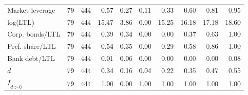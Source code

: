 \begin{threeparttable}
\begin{tabular}{lrrrrrrrrr}
Market leverage & 79 & 444 & 0.57 & 0.27 & 0.11 & 0.33 & 0.60 & 0.81 & 0.95 \\
log(LTL) & 79 & 444 & 15.47 & 3.86 & 0.00 & 15.25 & 16.18 & 17.18 & 18.60 \\
Corp. bonds/LTL & 79 & 444 & 0.39 & 0.34 & 0.00 & 0.00 & 0.37 & 0.63 & 1.00 \\
Pref. share/LTL & 79 & 444 & 0.54 & 0.35 & 0.00 & 0.29 & 0.58 & 0.86 & 1.00 \\
Bank debt/LTL & 79 & 444 & 0.01 & 0.06 & 0.00 & 0.00 & 0.00 & 0.00 & 0.08 \\
\ensuremath{\tilde{d}} & 79 & 444 & 0.34 & 0.16 & 0.04 & 0.22 & 0.35 & 0.47 & 0.55 \\
\ensuremath{I_{\tilde{d}>0}} & 79 & 444 & 1.00 & 0.00 & 1.00 & 1.00 & 1.00 & 1.00 & 1.00 \\
\bottomrule\end{tabular}\end{threeparttable}
